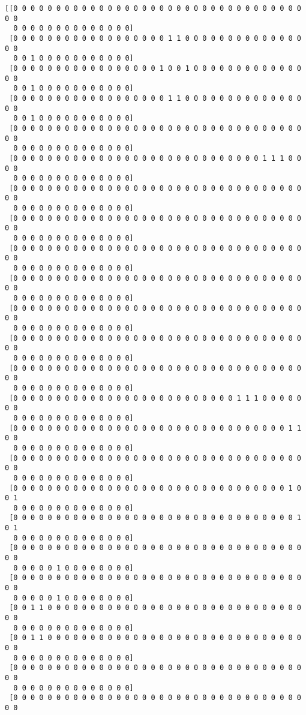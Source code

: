 \documentclass[11pt]{article}
\begin{document}
    \begin{Verbatim}[commandchars=\\\{\}]
[[0 0 0 0 0 0 0 0 0 0 0 0 0 0 0 0 0 0 0 0 0 0 0 0 0 0 0 0 0 0 0 0 0 0 0 0
  0 0 0 0 0 0 0 0 0 0 0 0 0 0]
 [0 0 0 0 0 0 0 0 0 0 0 0 0 0 0 0 0 0 1 1 0 0 0 0 0 0 0 0 0 0 0 0 0 0 0 0
  0 0 1 0 0 0 0 0 0 0 0 0 0 0]
 [0 0 0 0 0 0 0 0 0 0 0 0 0 0 0 0 0 1 0 0 1 0 0 0 0 0 0 0 0 0 0 0 0 0 0 0
  0 0 1 0 0 0 0 0 0 0 0 0 0 0]
 [0 0 0 0 0 0 0 0 0 0 0 0 0 0 0 0 0 0 1 1 0 0 0 0 0 0 0 0 0 0 0 0 0 0 0 0
  0 0 1 0 0 0 0 0 0 0 0 0 0 0]
 [0 0 0 0 0 0 0 0 0 0 0 0 0 0 0 0 0 0 0 0 0 0 0 0 0 0 0 0 0 0 0 0 0 0 0 0
  0 0 0 0 0 0 0 0 0 0 0 0 0 0]
 [0 0 0 0 0 0 0 0 0 0 0 0 0 0 0 0 0 0 0 0 0 0 0 0 0 0 0 0 0 1 1 1 0 0 0 0
  0 0 0 0 0 0 0 0 0 0 0 0 0 0]
 [0 0 0 0 0 0 0 0 0 0 0 0 0 0 0 0 0 0 0 0 0 0 0 0 0 0 0 0 0 0 0 0 0 0 0 0
  0 0 0 0 0 0 0 0 0 0 0 0 0 0]
 [0 0 0 0 0 0 0 0 0 0 0 0 0 0 0 0 0 0 0 0 0 0 0 0 0 0 0 0 0 0 0 0 0 0 0 0
  0 0 0 0 0 0 0 0 0 0 0 0 0 0]
 [0 0 0 0 0 0 0 0 0 0 0 0 0 0 0 0 0 0 0 0 0 0 0 0 0 0 0 0 0 0 0 0 0 0 0 0
  0 0 0 0 0 0 0 0 0 0 0 0 0 0]
 [0 0 0 0 0 0 0 0 0 0 0 0 0 0 0 0 0 0 0 0 0 0 0 0 0 0 0 0 0 0 0 0 0 0 0 0
  0 0 0 0 0 0 0 0 0 0 0 0 0 0]
 [0 0 0 0 0 0 0 0 0 0 0 0 0 0 0 0 0 0 0 0 0 0 0 0 0 0 0 0 0 0 0 0 0 0 0 0
  0 0 0 0 0 0 0 0 0 0 0 0 0 0]
 [0 0 0 0 0 0 0 0 0 0 0 0 0 0 0 0 0 0 0 0 0 0 0 0 0 0 0 0 0 0 0 0 0 0 0 0
  0 0 0 0 0 0 0 0 0 0 0 0 0 0]
 [0 0 0 0 0 0 0 0 0 0 0 0 0 0 0 0 0 0 0 0 0 0 0 0 0 0 0 0 0 0 0 0 0 0 0 0
  0 0 0 0 0 0 0 0 0 0 0 0 0 0]
 [0 0 0 0 0 0 0 0 0 0 0 0 0 0 0 0 0 0 0 0 0 0 0 0 0 0 1 1 1 0 0 0 0 0 0 0
  0 0 0 0 0 0 0 0 0 0 0 0 0 0]
 [0 0 0 0 0 0 0 0 0 0 0 0 0 0 0 0 0 0 0 0 0 0 0 0 0 0 0 0 0 0 0 0 1 1 0 0
  0 0 0 0 0 0 0 0 0 0 0 0 0 0]
 [0 0 0 0 0 0 0 0 0 0 0 0 0 0 0 0 0 0 0 0 0 0 0 0 0 0 0 0 0 0 0 0 0 0 0 0
  0 0 0 0 0 0 0 0 0 0 0 0 0 0]
 [0 0 0 0 0 0 0 0 0 0 0 0 0 0 0 0 0 0 0 0 0 0 0 0 0 0 0 0 0 0 0 0 1 0 0 1
  0 0 0 0 0 0 0 0 0 0 0 0 0 0]
 [0 0 0 0 0 0 0 0 0 0 0 0 0 0 0 0 0 0 0 0 0 0 0 0 0 0 0 0 0 0 0 0 0 1 0 1
  0 0 0 0 0 0 0 0 0 0 0 0 0 0]
 [0 0 0 0 0 0 0 0 0 0 0 0 0 0 0 0 0 0 0 0 0 0 0 0 0 0 0 0 0 0 0 0 0 0 0 0
  0 0 0 0 0 1 0 0 0 0 0 0 0 0]
 [0 0 0 0 0 0 0 0 0 0 0 0 0 0 0 0 0 0 0 0 0 0 0 0 0 0 0 0 0 0 0 0 0 0 0 0
  0 0 0 0 0 1 0 0 0 0 0 0 0 0]
 [0 0 1 1 0 0 0 0 0 0 0 0 0 0 0 0 0 0 0 0 0 0 0 0 0 0 0 0 0 0 0 0 0 0 0 0
  0 0 0 0 0 0 0 0 0 0 0 0 0 0]
 [0 0 1 1 0 0 0 0 0 0 0 0 0 0 0 0 0 0 0 0 0 0 0 0 0 0 0 0 0 0 0 0 0 0 0 0
  0 0 0 0 0 0 0 0 0 0 0 0 0 0]
 [0 0 0 0 0 0 0 0 0 0 0 0 0 0 0 0 0 0 0 0 0 0 0 0 0 0 0 0 0 0 0 0 0 0 0 0
  0 0 0 0 0 0 0 0 0 0 0 0 0 0]
 [0 0 0 0 0 0 0 0 0 0 0 0 0 0 0 0 0 0 0 0 0 0 0 0 0 0 0 0 0 0 0 0 0 0 0 0

\end{Verbatim}
\end{document}
